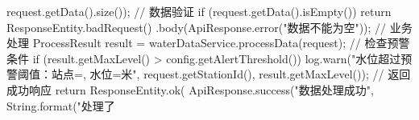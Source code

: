 request.getData().size()); // 数据验证 if (request.getData().isEmpty()) { return ResponseEntity.badRequest() .body(ApiResponse.error("数据不能为空")); } // 业务处理 ProcessResult result = waterDataService.processData(request); // 检查预警条件 if (result.getMaxLevel() > config.getAlertThreshold()) { log.warn("水位超过预警阈值：站点={}, 水位={}米", request.getStationId(), result.getMaxLevel()); } // 返回成功响应 return ResponseEntity.ok( ApiResponse.success("数据处理成功", String.format("处理了%